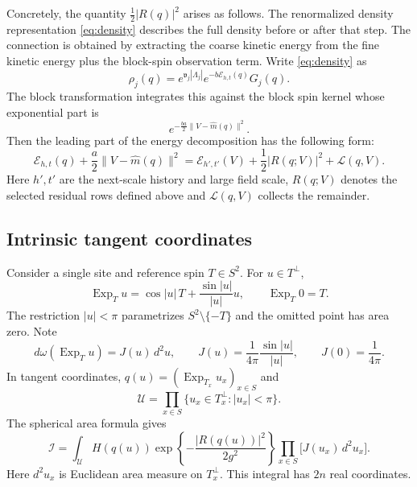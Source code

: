 \documentclass[11pt]{article}
\newcommand{\Exp}{\operatorname{Exp}}
\numberwithin{equation}{section}
\theoremstyle{definition}
\theoremstyle{plain}
\begin{document}
Concretely, the quantity $\tfrac12|R(q)|^2$ arises as follows.
The renormalized density representation \eqref{eq:density} describes the full density before or after that
step.  The connection is obtained by extracting the coarse kinetic
energy from the fine kinetic energy plus the block-spin observation
term.  Write \eqref{eq:density} as
\begin{equation}
 \rho_j(q)=e^{\mathfrak v_j|\Lambda_j|}
          e^{-b\mathcal E_{h,t}(q)}G_j(q).
\end{equation}
The block transformation integrates this against the block spin
kernel whose exponential part is
\begin{equation}
 e^{-\frac{ba}{2}\|V-\widehat m(q)\|^2}.
\end{equation}
Then the leading part of the energy decomposition has the following form:
\begin{equation} \label{eq:cEqV}
 \mathcal E_{h,t}(q)
 +\frac a2\|V-\widehat m(q)\|^2
 =\mathcal E_{h',t'}(V)
  +\frac12|R(q;V)|^2+\mathcal L(q,V).
\end{equation}
Here $h',t'$ are the next-scale history and large field scale, $R(q;V)$
denotes the selected residual rows defined above and $\mathcal L(q,V)$ collects the remainder.

\subsection{Intrinsic tangent coordinates}

Consider a single site and reference spin $T \in S^2$.
For $u\in T^\perp$,
\begin{equation}
 \Exp_T u=\cos|u|\,T+\frac{\sin|u|}{|u|}u,
 \qquad \Exp_T0=T.
\end{equation}
The restriction $|u|<\pi$ parametrizes $S^2\setminus\{-T\}$ and the omitted point has area zero.
Note
\begin{equation}
 d\omega(\Exp_Tu)=J(u)\,d^2u,
 \qquad J(u)=\frac1{4\pi}\frac{\sin|u|}{|u|},
 \qquad J(0)=\frac1{4\pi}.
 \label{eq:area}
\end{equation}
In tangent coordinates, 
$q(u)=(\Exp_{T_x}u_x)_{x\in S}$ and
\begin{equation}
 \mathcal U=\prod_{x\in S}
       \{u_x\in T_x^\perp:|u_x|<\pi\}.
\end{equation}
The spherical area formula gives
\begin{equation}
 \mathcal I=
 \int_{\mathcal U} H(q(u))
 \exp\!\left\{-\frac{|R(q(u))|^2}{2g^2}\right\}
 \prod_{x\in S}\bigl[J(u_x)\,d^2u_x\bigr].
\end{equation}
Here $d^2u_x$ is Euclidean area measure on $T_x^\perp$.
This integral has $2n$ real coordinates.
\end{document}
